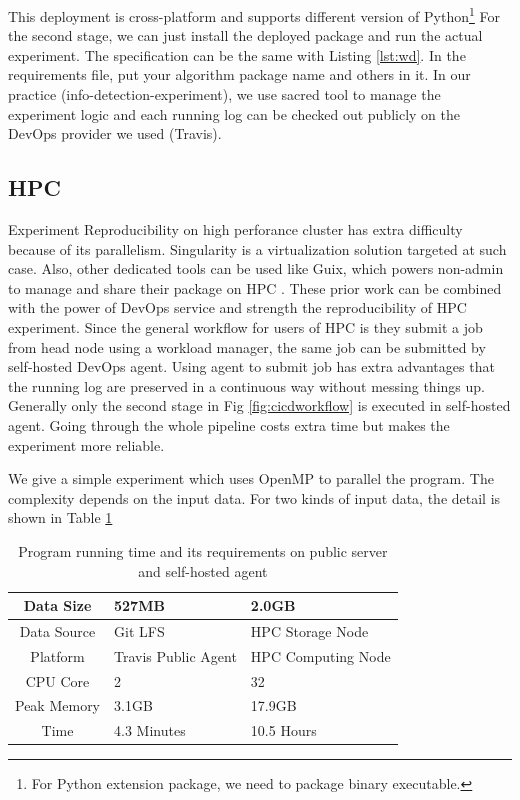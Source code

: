 \documentclass{IEEEcsmag}
\begin{document}
This deployment is cross-platform and supports different version of Python\footnote{For Python extension package, we need to package binary executable.} For the second stage, we can just install the deployed package and run the actual experiment. The specification can be the same with Listing \ref{lst:wd}. In the requirements file, put your algorithm package name and others in it. In our practice (info-detection-experiment), we use sacred tool \cite{greff2017sacred} to manage the experiment logic and each running log can be checked out publicly on the DevOps provider we used (Travis).



\subsection{HPC}
Experiment Reproducibility on high perforance cluster has extra difficulty because of its parallelism. Singularity is a virtualization solution targeted at such case. %
Also, other dedicated tools can be used like Guix, which powers non-admin to manage and share their package on HPC \cite{courtes2015reproducible}. These prior work can be combined with the power of DevOps service and strength the reproducibility of HPC experiment. Since the general workflow for users of HPC is they submit a job from head node using a workload manager, the same job can be submitted by self-hosted DevOps agent. Using agent to submit job has extra advantages that the running log are preserved in a continuous way without messing things up. Generally only the second stage in Fig \ref{fig:cicdworkflow}
is executed in self-hosted agent. Going through the whole pipeline costs extra time but makes the experiment more reliable.

We give a simple experiment which uses OpenMP to parallel the program. The complexity depends on the input data. For two kinds of input data, the detail is shown in Table \ref{tab:time}
\begin{table}
\centering
\begin{tabular}{|c|p{1.5cm}|p{1.5cm}|}
\hline
Data Size & 527MB & 2.0GB\\
\hline
Data Source & Git LFS & HPC Storage Node \\
\hline
Platform & Travis Public Agent & HPC Computing Node \\
\hline
CPU Core & 2 & 32  \\ 
\hline
Peak Memory  & 3.1GB  & 17.9GB\\ 
\hline
Time & 4.3 Minutes & 10.5 Hours \\
\hline
\end{tabular}
\caption{Program running time and its requirements on public server and self-hosted agent}\label{tab:time}
\end{table}
\end{document}
